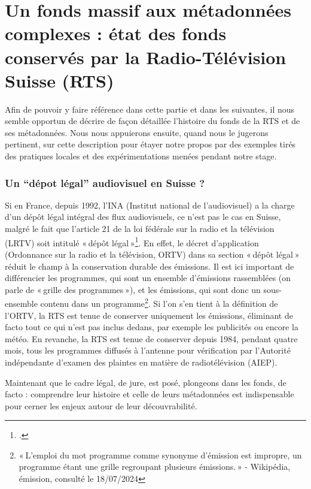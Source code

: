\chapter{Un fonds massif aux métadonnées complexes : état des fonds conservés par la Radio-Télévision Suisse (RTS)}

Afin de pouvoir y faire référence dans cette partie et dans les suivantes, il nous semble opportun de décrire de façon détaillée l’histoire du fonds de la RTS et de ses métadonnées. Nous nous appuierons ensuite, quand nous le jugerons pertinent, sur cette description pour étayer notre propos par des exemples tirés des pratiques locales et des expérimentations menées pendant notre stage. 

\subsection{Un \enquote{dépot légal} audiovisuel en Suisse ?}


Si en France, depuis 1992, l’INA (Institut national de l’audiovisuel) a la charge d’un dépôt légal intégral des flux audiovisuels, ce n’est pas le cas en Suisse, malgré le fait que l’article 21 de la loi fédérale sur la radio et la télévision (LRTV) soit intitulé « dépôt légal »\footcite{zotero-260}. En effet, le décret d’application (Ordonnance sur la radio et la télévision, ORTV) dans sa section « dépôt légal » réduit le champ à la conservation durable des émissions. Il est ici important de différencier les programmes, qui sont un ensemble d’émissions rassemblées (on parle de « grille des programmes »), et les émissions, qui sont donc un sous-ensemble contenu dans un programme\footnote{« L'emploi du mot programme comme synonyme d'émission est impropre, un programme étant une grille regroupant plusieurs émissions. » - Wikipédia, émission, consulté le 18/07/2024}. Si l’on s’en tient à la définition de l’ORTV, la RTS est tenue de conserver uniquement les émissions, éliminant de facto tout ce qui n’est pas inclus dedans, par exemple les publicités ou encore la météo. En revanche, la RTS est tenue de conserver depuis 1984, pendant quatre mois, tous les programmes diffusés à l’antenne pour vérification par l’Autorité indépendante d’examen des plaintes en matière de radiotélévision (AIEP).

Maintenant que le cadre légal, de jure, est posé, plongeons dans les fonds, de facto : comprendre leur histoire et celle de leurs métadonnées est indispensable pour cerner les enjeux autour de leur découvrabilité.

